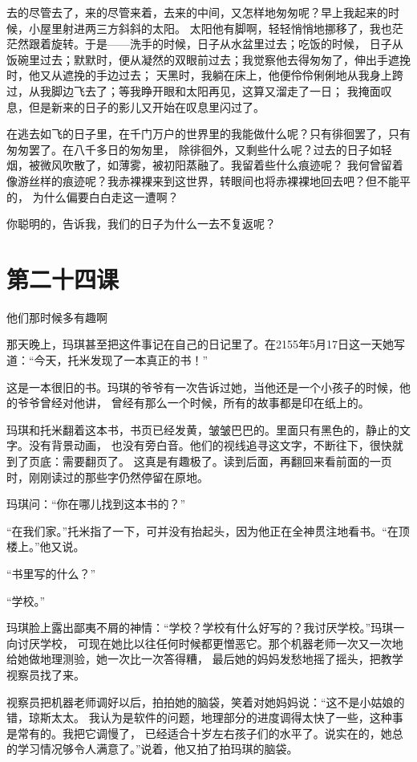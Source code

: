 \documentclass[12pt,UTF8]{ctexbook}
\begin{document}
去的尽管去了，来的尽管来着，去来的中间，又怎样地匆匆呢？早上我起来的时候，小屋里射进两三方斜斜的太阳。
太阳他有脚啊，轻轻悄悄地挪移了，我也茫茫然跟着旋转。于是——洗手的时候，日子从水盆里过去；吃饭的时候，
日子从饭碗里过去；默默时，便从凝然的双眼前过去；我觉察他去得匆匆了，伸出手遮挽时，他又从遮挽的手边过去；
天黑时，我躺在床上，他便伶伶俐俐地从我身上跨过，从我脚边飞去了；等我睁开眼和太阳再见，这算又溜走了一日；
我掩面叹息，但是新来的日子的影儿又开始在叹息里闪过了。

在逃去如飞的日子里，在千门万户的世界里的我能做什么呢？只有徘徊罢了，只有匆匆罢了。在八千多日的匆匆里，
除徘徊外，又剩些什么呢？过去的日子如轻烟，被微风吹散了，如薄雾，被初阳蒸融了。我留着些什么痕迹呢？
我何曾留着像游丝样的痕迹呢？我赤裸裸来到这世界，转眼间也将赤裸裸地回去吧？但不能平的，
为什么偏要白白走这一遭啊？

你聪明的，告诉我，我们的日子为什么一去不复返呢？

\section{第二十四课}

他们那时候多有趣啊

那天晚上，玛琪甚至把这件事记在自己的日记里了。在2155年5月17日这一天她写道：“今天，托米发现了一本真正的书！”

这是一本很旧的书。玛琪的爷爷有一次告诉过她，当他还是一个小孩子的时候，他的爷爷曾经对他讲，
曾经有那么一个时候，所有的故事都是印在纸上的。

玛琪和托米翻着这本书，书页已经发黄，皱皱巴巴的。里面只有黑色的，静止的文字。没有背景动画，
也没有旁白音。他们的视线追寻这文字，不断往下，很快就到了页底：需要翻页了。
这真是有趣极了。读到后面，再翻回来看前面的一页时，刚刚读过的那些字仍然停留在原地。

玛琪问：“你在哪儿找到这本书的？”

“在我们家。”托米指了一下，可并没有抬起头，因为他正在全神贯注地看书。“在顶楼上。”他又说。

“书里写的什么？”

“学校。”

玛琪脸上露出鄙夷不屑的神情：“学校？学校有什么好写的？我讨厌学校。”玛琪一向讨厌学校，
可现在她比以往任何时候都更憎恶它。那个机器老师一次又一次地给她做地理测验，她一次比一次答得糟，
最后她的妈妈发愁地摇了摇头，把教学视察员找了来。

视察员把机器老师调好以后，拍拍她的脑袋，笑着对她妈妈说：“这不是小姑娘的错，琼斯太太。
我认为是软件的问题，地理部分的进度调得太快了一些，这种事是常有的。我把它调慢了，
已经适合十岁左右孩子们的水平了。说实在的，她总的学习情况够令人满意了。”说着，他又拍了拍玛琪的脑袋。
\end{document}
